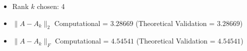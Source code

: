 \begin{itemize}
    \item Rank $k$ chosen: 4
    \item $\|A - A_k\|_2$ Computational = $3.28669$ (Theoretical Validation = $3.28669$)
    \item $\|A - A_k\|_F$ Computational = $4.54541$ (Theoretical Validation = $4.54541$)
\end{itemize}
